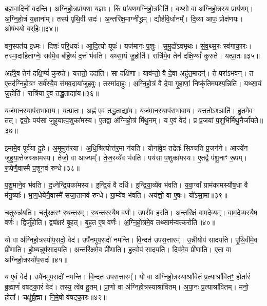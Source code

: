 ब्र॒ह्म॒वा॒दिनो॑ वदन्ति।
अ॒ग्नि॒हो॒त्रप्रा॑यणा य॒ज्ञाः।
किं प्रा॑यणमग्निहो॒त्रमिति॑।
व॒थ्सो वा अ॑ग्निहो॒त्रस्य॒ प्राय॑णम्।
अ॒ग्नि॒हो॒त्रं य॒ज्ञाना᳚म्।
तस्य॑ पृथि॒वी सदः॑।
अ॒न्तरि॑क्ष॒माग्नी᳚द्ध्रम्।
द्यौर्\mbox{}ह॑वि॒र्धानम्᳚।
दि॒व्या आपः॒ प्रोक्ष॑णयः।
ओष॑धयो ब॒र्॒हिः॥३४॥\ip

वन॒स्पत॑य इ॒ध्मः।
दिशः॑ परि॒धयः॑।
आ॒दि॒त्यो यूपः॑।
यज॑मानः प॒शुः।
स॒मु॒द्रो॑\-ऽवभृ॒थः।
सं॒व॒थ्स॒रः स्व॑गाका॒रः।
तस्मा॒दाहि॑ताग्नेः॒ सर्व॑मे॒व ब॑र्हि॒ष्यं॑ द॒त्तं भ॑वति।
यथ्सा॒यं जु॒होति॑।
रात्रि॑मे॒व तेन॑ दक्षि॒ण्यां᳚ कुरुते।
यत्प्रा॒तः॥३५॥\ip

अह॑रे॒व तेन॑ दक्षि॒ण्यं॑ कुरुते।
यत्ततो॒ ददा॑ति।
सा दक्षि॑णा।
याव॑न्तो॒ वै दे॒वा अहु॑त॒मादन्॑।
ते परा॑\-ऽभवन्।
त ए॒तद॑ग्निहो॒त्रꣳ सर्व॑स्यै॒व स॑मव॒दाया॑जुहवुः।
तस्मा॑दाहुः।
अ॒ग्नि॒हो॒त्रं वै दे॒वा गृ॒हाणां॒ निष्कृ॑तिमपश्य॒न्निति॑।
यथ्सा॒यं जु॒होति॑।
रात्रि॑या ए॒व तद्धु॒ताद्या॑य॥३६॥\ip

यज॑मान॒स्याप॑रा\-भावाय।
यत्प्रा॒तः।
अह्न॑ ए॒व तद्धु॒ताद्या॑य।
यज॑मान॒स्याप॑राभावाय।
यत्ततो॒\-ऽश्ञाति॑।
हु॒तमे॒व तत्।
द्वयोः॒ पय॑सा जुहुयात्प॒शुका॑मस्य।
ए॒तद्वा अ॑ग्निहो॒त्रं मि॑थु॒नम्।
य ए॒वं वेद॑।
प्र प्र॒जया॑ प॒शुभि॑र्मिथु॒नैर्जा॑यते॥३७॥\ip

इ॒मामे॒व पूर्व॑या दु॒हे।
अ॒मूमुत्त॑रया।
अ॒धि॒श्रित्योत्त॑र॒मा न॑यति।
योना॑वे॒व तद्रेतः॑ सिञ्चति प्र॒जन॑ने।
आज्ये॑न जुहुया॒त्तेज॑स्कामस्य।
तेजो॒ वा आज्यम्᳚।
ते॒ज॒स्व्ये॑व भ॑वति।
पय॑सा प॒शुका॑मस्य।
ए॒तद्वै प॑शू॒नाꣳ रू॒पम्।
रू॒पेणै॒वास्मै॑ प॒शूनव॑ रुन्धे॥३८॥\ip

प॒शु॒माने॒व भ॑वति।
द॒ध्नेन्द्रि॒यका॑मस्य।
इ॒न्द्रि॒यं वै दधि॑।
इ॒न्द्रि॒या॒व्ये॑व भ॑वति।
य॒वा॒ग्वा᳚ ग्राम॑कामस्यौष॒धा वै म॑नु॒ष्याः᳚।
भा॒ग॒धेये॑नै॒वास्मै॑ सजा॒तानव॑ रुन्धे।
ग्रा॒म्ये॑व भ॑वति।
अय॑ज्ञो॒ वा ए॒षः।
यो॑ऽसा॒मा॥३९॥\ip

च॒तुरुन्न॑यति।
चतु॑रक्षरꣳ रथन्त॒रम्।
र॒थ॒न्त॒रस्यै॒ष वर्णः॑।
उ॒परी॑व हरति।
अ॒न्तरि॑क्षं वामदे॒व्यम्।
वा॒म॒दे॒व्यस्यै॒ष वर्णः॑।
द्विर्जु॑होति।
द्व्य॑क्षरं बृ॒हत्।
बृ॒ह॒त ए॒ष वर्णः॑।
अ॒ग्नि॒हो॒त्रमे॒व तथ्साम॑न्वत्करोति॥४०॥\ip

यो वा अ॑ग्निहो॒त्रस्यो॑प॒सदो॒ वेद॑।
उपै॑नमुप॒सदो॑ नमन्ति।
वि॒न्दत॑ उपस॒त्तारम्᳚।
उ॒न्नीयोप॑ सादयति।
पृ॒थि॒वीमे॒व प्री॑णाति।
हो॒ष्यन्नुप॑सादयति।
अ॒न्तरि॑क्षमे॒व प्री॑णाति।
हु॒त्वोप॑ सादयति।
दिव॑मे॒व प्री॑णाति।
ए॒ता वा अ॑ग्निहो॒त्रस्यो॑प॒सदः॑॥४१॥\ip

य ए॒वं वेद॑।
उपै॑नमुप॒सदो॑ नमन्ति।
वि॒न्दत॑ उपस॒त्तारम्᳚।
यो वा अ॑ग्निहो॒त्रस्याश्रा॑वितं प्र॒त्याश्रा॑वित॒ꣳ॒ होता॑रं ब्र॒ह्माणं॑ वषट्का॒रं वेद॑।
तस्य॒ त्वे॑व हु॒तम्।
प्रा॒णो वा अ॑ग्निहो॒त्रस्याश्रा॑वितम्।
अ॒पा॒नः प्र॒त्याश्रा॑वितम्।
मनो॒ होता᳚।
चक्षु॑र्ब्र॒ह्मा।
नि॒मे॒षो व॑षट्का॒रः॥४२॥\ip


